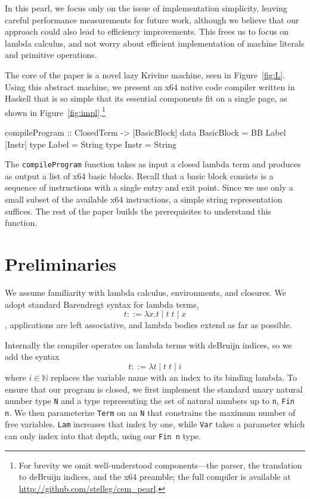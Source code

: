 \documentclass[preprint]{sigplanconf}
\begin{document}
In this pearl, we focus only on the issue of implementation simplicity, leaving
careful performance measurements for future work, although we believe that our
approach could also lead to efficiency improvements. This frees us to focus on
lambda calculus, and not worry about efficient implementation of machine
literals and primitive operations. 

The core of the paper is a novel lazy Krivine machine, seen in
Figure~\ref{fig:L}. Using this abstract machine, we present an x64 native code
compiler written in Haskell that is so simple that its essential components fit
on a single page, as shown in Figure~\ref{fig:impl}.\footnote{For brevity we
omit well-understood components---the parser, the translation to deBruijn
indices, and the x64 preamble; the full compiler is available at
\url{http://github.com/stelleg/cem_pearl}.} 

\begin{code}
compileProgram :: ClosedTerm -> [BasicBlock]
data BasicBlock = BB Label [Instr]
type Label = String
type Instr = String
\end{code}

The \texttt{compileProgram} function takes as input a closed lambda term and
produces as output a list of x64 basic blocks. Recall that a basic block
consists is a sequence of instructions with a single entry and exit point.
Since we use only a small subset of the available x64 instructions, a simple
string representation suffices. The rest of the paper builds the prerequisites
to understand this function.

\section{Preliminaries}
We assume familiarity with lambda calculus, environments, and closures.
We adopt standard Barendregt syntax \cite{barendregt1984lambda} for lambda
terms, $$ t ::=  \lambda x.t \; | \; t \;  t \; | \; x $$, applications are
left associative, and lambda bodies extend as far as possible. 

Internally the compiler operates on lambda terms with deBruijn indices, so we
add the syntax $$ t ::= \lambda t \; | \; t \; t \; | \; i $$ where $i \in
\mathbb{N}$ replaces the variable name with an index to its binding lambda. To
ensure that our program is closed, we first implement the standard unary natural
number type \texttt{N} and a type representing the set of natural numbers up to
\texttt{n}, \texttt{Fin n}. We then parameterize \texttt{Term} on an \texttt{N}
that constrains the maximum number of free variables. \texttt{Lam} increases
that index by one, while \texttt{Var} takes a parameter which can only index
into that depth, using our \texttt{Fin n} type.
\end{document}
